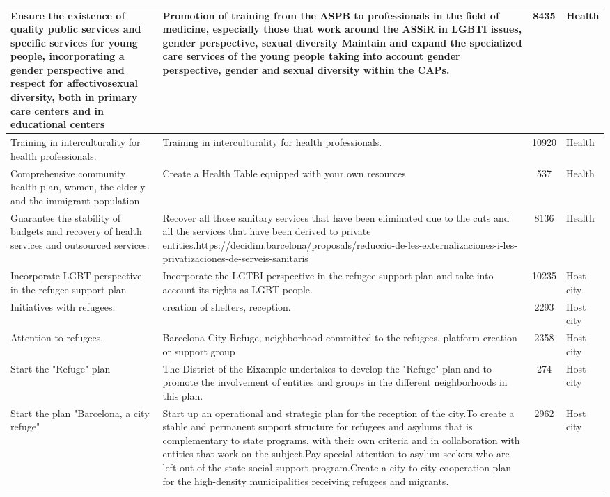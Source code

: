 \begin{spacing}{1}
\begin{longtable}{m{30mm}|m{85mm}|c|m{15mm}}
 Ensure the existence of quality public services and specific services for young people, incorporating a gender perspective and respect for affectivosexual diversity, both in primary care centers and in educational centers & Promotion of training from the ASPB to professionals in the field of medicine, especially those that work around the ASSiR in LGBTI issues, gender perspective, sexual diversity Maintain and expand the specialized care services of the young people taking into account gender perspective, gender and sexual diversity within the CAPs. & 8435 & Health \\ \hline
 Training in interculturality for health professionals. & Training in interculturality for health professionals. & 10920 & Health \\ \hline
 Comprehensive community health plan, women, the elderly and the immigrant population & Create a Health Table equipped with your own resources & 537 & Health \\ \hline
 Guarantee the stability of budgets and recovery of health services and outsourced services: & Recover all those sanitary services that have been eliminated due to the cuts and all the services that have been derived to private entities.https://decidim.barcelona/proposals/reduccio-de-les-externalizaciones-i-les-privatizaciones-de-serveis-sanitaris & 8136 & Health \\ \hline
 Incorporate LGBT perspective in the refugee support plan & Incorporate the LGTBI perspective in the refugee support plan and take into account its rights as LGBT people. & 10235 & Host city \\ \hline
 Initiatives with refugees. & creation of shelters, reception. & 2293 & Host city \\ \hline
 Attention to refugees. & Barcelona City Refuge, neighborhood committed to the refugees, platform creation or support group & 2358 & Host city \\ \hline
 Start the "Refuge" plan & The District of the Eixample undertakes to develop the "Refuge" plan and to promote the involvement of entities and groups in the different neighborhoods in this plan. & 274 & Host city \\ \hline
 Start the plan "Barcelona, ​​a city refuge" & Start up an operational and strategic plan for the reception of the city.To create a stable and permanent support structure for refugees and asylums that is complementary to state programs, with their own criteria and in collaboration with entities that work on the subject.Pay special attention to asylum seekers who are left out of the state social support program.Create a city-to-city cooperation plan for the high-density municipalities receiving refugees and migrants. & 2962 & Host city \\ \hline

\end{longtable}
\end{spacing}
